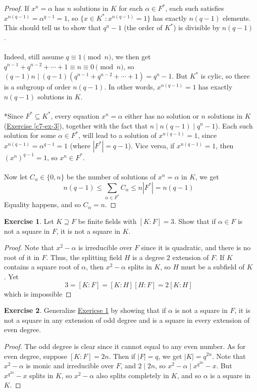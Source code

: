 \documentclass{article}
\theoremstyle{definition}
\newtheorem{exercise}{Exercise}
\begin{document}
\begin{proof}
If $x^n = \alpha$ has $n$ solutions in $K$ for each $\alpha \in F^*$, each such satisfies $x^{n (q - 1)} = \alpha^{q - 1} = 1$, so $\{ x \in K^* : x^{n (q - 1)} = 1 \}$ has exactly $n (q - 1)$ elements. This should tell us to show that $q^n - 1$ (the order of $K^*$) is divisible by $n (q - 1)$.
\\
\\
Indeed, still assume $q \equiv 1 \pmod{n}$, we then get $q^{n - 1} + q^{n - 2} + \cdots + 1 \equiv n \equiv 0 \pmod{n}$, so $(q - 1)n \mid (q - 1) (q^{n - 1} + q^{n - 2} + \cdots + 1) = q^n - 1$. But $K^*$ is cylic, so there is a subgroup of order $n (q - 1)$. In other words, $x^{n (q - 1)} = 1$ has exactly $n (q - 1)$ solutions in $K$.
\\
\\
*Since $F^* \subseteq K^*$, every equation $x^n = \alpha$ either has no solution or $n$ solutions in $K$ (\hyperref[c7-ex-3]{Exercise \ref*{c7-ex-3}}), together with the fact that $n \mid n (q - 1) \mid q^n - 1$). Each such solution for some $\alpha \in F^*$, will lead to a solution of $x^{n(q - 1)} = 1$, since $x^{n(q - 1)} = \alpha^{q - 1} = 1$ (where $|F^*| = q - 1$). Vice versa, if $x^{n (q - 1)} = 1$, then $(x^n)^{q - 1} = 1$, so $x^n \in F^*$.
\\
\\
Now let $C_\alpha \in \{ 0, n \}$ be the number of solutions of $x^n = \alpha$ in $K$, we get
$$n (q - 1) \leq \sum_{\alpha \in F^*} C_\alpha \leq n |F^*| = n (q - 1)$$
Equality happens, and so $C_\alpha = n$.
\end{proof}

\newpage

\begin{exercise} \label{c7-ex-6}
Let $K \supseteq F$ be finite fields with $[K : F] = 3$. Show that if $\alpha \in F$ is not a square in $F$, it is
not a square in $K$.
\end{exercise}
\begin{proof}
Note that $x^2 - \alpha$ is irreducible over $F$ since it is quadratic, and there is no root of it in $F$. Thus, the splitting field $H$ is a degree $2$ extension of $F$. If $K$ contains a square root of $\alpha$, then $x^2 - \alpha$ splits in $K$, so $H$ must be a subfield of $K$. Yet
$$3 = [K:F] = [K : H] [H : F] = 2 [K : H]$$
which is impossible
\end{proof}
\begin{exercise}
Generalize \hyperref[c7-ex-6]{Exericse \ref*{c7-ex-6}} by showing that if $\alpha$ is not a square in $F$, it is not a square in any extension of odd degree and is a square in every extension of even degree.
\end{exercise}
\begin{proof}
The odd degree is clear since it cannot equal to any even number. As for even degree, suppose $[K : F] = 2n$. Then if $|F| = q$, we get $|K| = q^{2n}$. Note that $x^2 - \alpha$ is monic and irreducible over $F$, and $2 \mid 2n$, so $x^2 - \alpha \mid x^{q^{2n}} - x$. But $x^{q^{2n}} - x$ splits in $K$, so $x^2 - \alpha$ also splits completely in $K$, and so $\alpha$ is a square in $K$.
\end{proof}
\end{document}
